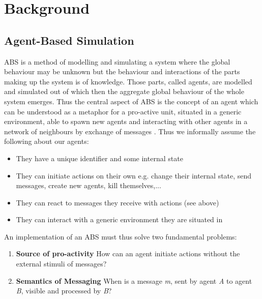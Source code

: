 \section{Background}

\subsection{Agent-Based Simulation}
ABS is a method of modelling and simulating a system where the global behaviour may be unknown but the behaviour and interactions of the parts making up the system is of knowledge. Those parts, called agents, are modelled and simulated out of which then the aggregate global behaviour of the whole system emerges. Thus the central aspect of ABS is the concept of an agent which can be understood as a metaphor for a pro-active unit, situated in a generic environment, able to spawn new agents and interacting with other agents in a network of neighbours by exchange of messages \cite{wooldridge_introduction_2009}. Thus we informally assume the following about our agents:

\begin{itemize}
	\item They have a unique identifier and some internal state
	\item They can initiate actions on their own e.g. change their internal state, send messages, create new agents, kill themselves,...
	\item They can react to messages they receive with actions (see above)
	\item They can interact with a generic environment they are situated in
\end{itemize} 

An implementation of an ABS must thus solve two fundamental problems:

\begin{enumerate}
	\item \textbf{Source of pro-activity} How can an agent initiate actions without the external stimuli of messages?
	\item \textbf{Semantics of Messaging} When is a message \textit{m}, sent by agent \textit{A} to agent \textit{B}, visible and processed by \textit{B}?
\end{enumerate}

